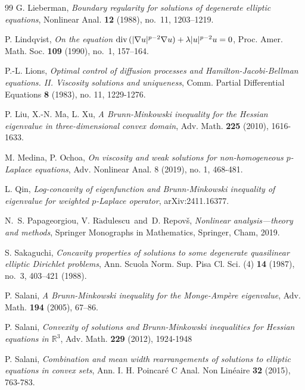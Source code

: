 \documentclass[12pt]{amsart}
\newcommand{\R}{\mathbb R}
\newcommand{\1}{\mathbf 1}
\begin{document}
\begin{thebibliography}{99}
 G. Lieberman, {\em Boundary regularity for solutions of degenerate elliptic equations}, Nonlinear Anal. {\bf 12} (1988), no.~11, 1203--1219.

 P. Lindqvist, {\em On the equation ${\rm div}\,(|\nabla u|^{p-2}\nabla u)+\lambda|u|^{p-2}u=0$}, Proc. Amer. Math. Soc. {\bf 109} (1990), no.~1, 157--164.

 P.-L. Lions, {\em Optimal control of diffusion processes and Hamilton-Jacobi-Bellman equations. II. Viscosity solutions and uniqueness}, Comm. Partial Differential Equations {\bf 8} (1983), no. 11, 1229-1276.

 P. Liu, X.-N. Ma, L. Xu, {\em A Brunn-Minkowski inequality for the Hessian eigenvalue in three-dimensional convex domain}, Adv. Math. {\bf 225} (2010), 1616-1633.

 M. Medina, P. Ochoa, {\em On viscosity and weak solutions for non-homogeneous $p$-Laplace equations}, Adv. Nonlinear Anal. 8 (2019), no. 1, 468-481.


 L. Qin, {\em Log-concavity of eigenfunction and Brunn-Minkowski inequality of eigenvalue for weighted $p$-Laplace operator}, arXiv:2411.16377.

N.~S. Papageorgiou, V. R$\mathrm{\check{a}}$dulescu\ and\ D. Repov\v{s}, {\it Nonlinear analysis---theory and methods}, Springer Monographs in Mathematics, Springer, Cham, 2019.

 S. Sakaguchi, {\em Concavity properties of solutions to some degenerate quasilinear elliptic Dirichlet problems}, Ann. Scuola Norm. Sup. Pisa Cl. Sci. (4) {\bf 14} (1987), no.~3, 403--421 (1988).

 P. Salani, {\em A Brunn-Minkowski inequality for the Monge-Amp\`ere eigenvalue}, Adv. Math. {\bf 194} (2005), 67--86.

P. Salani, {\em Convexity of solutions and Brunn-Minkowski inequalities for Hessian equations in $\R^3$}, Adv. Math. {\bf 229} (2012), 1924-1948

 P. Salani, {\em Combination and mean width rearrangements of solutions to elliptic equations in convex sets}, Ann. I. H. Poincar\'e C Anal. Non Lin\'eaire {\bf 32} (2015), 763-783.


\end{thebibliography}
\end{document}
